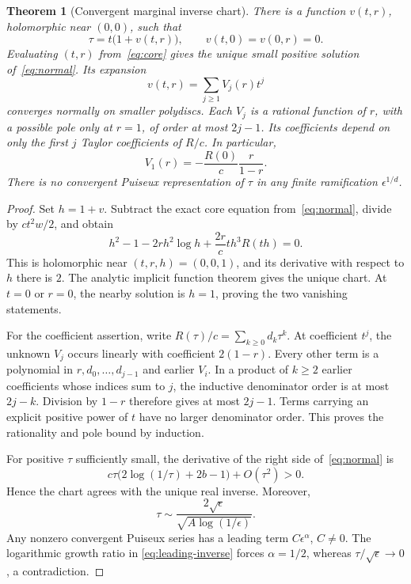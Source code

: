 \documentclass[11pt,a4paper]{article}
\numberwithin{equation}{section}
\newtheorem{theorem}{Theorem}[section]
\theoremstyle{definition}
\theoremstyle{remark}
\begin{document}
\begin{theorem}[Convergent marginal inverse chart]
\label{thm:lambert-chart}
There is a function \(v(t,r)\), holomorphic near \((0,0)\), such that
\begin{equation}
 \tau=t\bigl(1+v(t,r)\bigr),\qquad
 v(t,0)=v(0,r)=0.
 \label{eq:chart}
\end{equation}
Evaluating \((t,r)\) from~\eqref{eq:core} gives the unique small positive
solution of~\eqref{eq:normal}. Its expansion
\begin{equation}
 v(t,r)=\sum_{j\ge1}V_j(r)t^j
 \label{eq:V}
\end{equation}
converges normally on smaller polydiscs. Each \(V_j\) is a rational function
of \(r\), with a possible pole only at \(r=1\), of order at most \(2j-1\).
Its coefficients depend on only the first \(j\) Taylor coefficients of
\(R/c\). In particular,
\[
 V_1(r)=-\frac{R(0)}c\frac r{1-r}.
\]
There is no convergent Puiseux representation of \(\tau\) in any finite
ramification \(\epsilon^{1/d}\).
\end{theorem}
\begin{proof}
Set \(h=1+v\). Subtract the exact core equation from~\eqref{eq:normal}, divide
by \(ct^2w/2\), and obtain
\begin{equation}
 h^2-1-2rh^2\log h+\frac{2r}{c}t h^3R(th)=0.
 \label{eq:reduced}
\end{equation}
This is holomorphic near \((t,r,h)=(0,0,1)\), and its derivative with respect
to \(h\) there is \(2\). The analytic implicit function theorem gives the
unique chart. At \(t=0\) or \(r=0\), the nearby solution is \(h=1\), proving
the two vanishing statements.

For the coefficient assertion, write \(R(\tau)/c=\sum_{k\ge0}d_k\tau^k\).
At coefficient \(t^j\), the unknown \(V_j\) occurs linearly with coefficient
\(2(1-r)\). Every other term is a polynomial in \(r,d_0,\ldots,d_{j-1}\)
and earlier \(V_i\). In a product of \(k\ge2\) earlier coefficients whose
indices sum to \(j\), the inductive denominator order is at most \(2j-k\).
Division by \(1-r\) therefore gives at most \(2j-1\). Terms carrying an
explicit positive power of \(t\) have no larger denominator order. This proves
the rationality and pole bound by induction.

For positive \(\tau\) sufficiently small, the derivative of the right side
of~\eqref{eq:normal} is
\[
 c\tau\bigl(2\log(1/\tau)+2b-1\bigr)+O(\tau^2)>0.
\]
Hence the chart agrees with the unique real inverse. Moreover,
\begin{equation}
 \tau\sim \frac{2\sqrt\epsilon}{\sqrt{A\log(1/\epsilon)}}.
 \label{eq:leading-inverse}
\end{equation}
Any nonzero convergent Puiseux series has a leading term
\(C\epsilon^\alpha\), \(C\ne0\). The logarithmic growth ratio in
\eqref{eq:leading-inverse} forces \(\alpha=1/2\), whereas
\(\tau/\sqrt\epsilon\to0\), a contradiction.
\end{proof}
\end{document}
